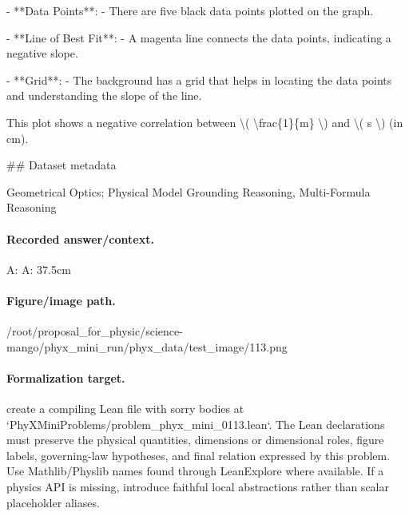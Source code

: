 - **Data Points**:
  - There are five black data points plotted on the graph.

- **Line of Best Fit**:
  - A magenta line connects the data points, indicating a negative slope.

- **Grid**:
  - The background has a grid that helps in locating the data points and understanding the slope of the line.

This plot shows a negative correlation between \textbackslash{}( \textbackslash{}frac\{1\}\{m\} \textbackslash{}) and \textbackslash{}( s \textbackslash{}) (in cm).

\#\# Dataset metadata

Geometrical Optics; Physical Model Grounding Reasoning, Multi-Formula Reasoning

\paragraph{Recorded answer/context.}
A: A: 37.5cm

\paragraph{Figure/image path.}
/root/proposal\_for\_physic/science-mango/phyx\_mini\_run/phyx\_data/test\_image/113.png

\paragraph{Formalization target.}
create a compiling Lean file with sorry bodies at `PhyXMiniProblems/problem\_phyx\_mini\_0113.lean`. The Lean declarations must preserve the physical quantities, dimensions or dimensional roles, figure labels, governing-law hypotheses, and final relation expressed by this problem.
Use Mathlib/Physlib names found through LeanExplore where available. If a physics API is missing, introduce faithful local abstractions rather than scalar placeholder aliases.

